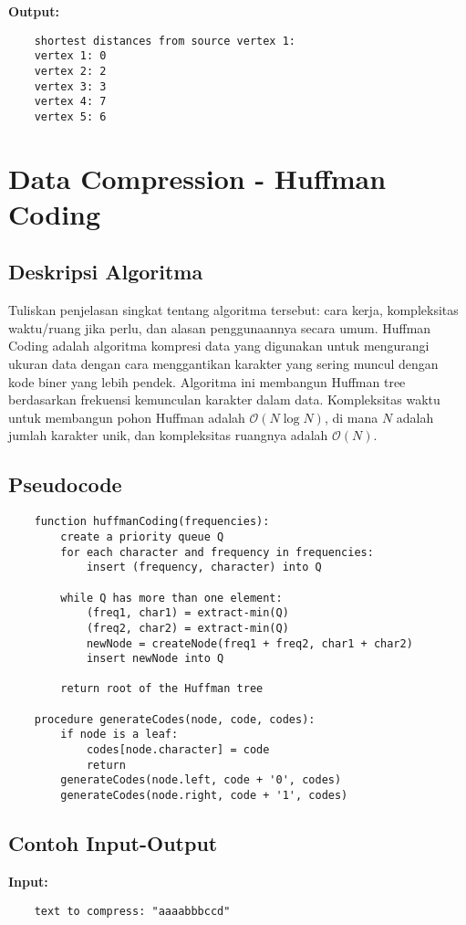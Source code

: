 \textbf{Output:}
\begin{verbatim}
    shortest distances from source vertex 1:
    vertex 1: 0
    vertex 2: 2
    vertex 3: 3
    vertex 4: 7
    vertex 5: 6
\end{verbatim}

\section{Data Compression - Huffman Coding}
\label{sec:huffman-coding-implementation}

\subsection{Deskripsi Algoritma}
Tuliskan penjelasan singkat tentang algoritma tersebut: cara kerja, kompleksitas waktu/ruang jika perlu, dan alasan penggunaannya secara umum.
Huffman Coding adalah algoritma kompresi data yang digunakan untuk mengurangi ukuran data dengan cara menggantikan karakter yang sering muncul dengan kode biner yang lebih pendek. Algoritma ini membangun Huffman tree berdasarkan frekuensi kemunculan karakter dalam data. Kompleksitas waktu untuk membangun pohon Huffman adalah $\mathcal{O}\left(N \log N\right)$, di mana $N$ adalah jumlah karakter unik, dan kompleksitas ruangnya adalah $\mathcal{O}\left(N\right)$.

\subsection{Pseudocode}
\begin{verbatim}
    function huffmanCoding(frequencies):
        create a priority queue Q
        for each character and frequency in frequencies:
            insert (frequency, character) into Q

        while Q has more than one element:
            (freq1, char1) = extract-min(Q)
            (freq2, char2) = extract-min(Q)
            newNode = createNode(freq1 + freq2, char1 + char2)
            insert newNode into Q

        return root of the Huffman tree

    procedure generateCodes(node, code, codes):
        if node is a leaf:
            codes[node.character] = code
            return
        generateCodes(node.left, code + '0', codes)
        generateCodes(node.right, code + '1', codes)
\end{verbatim}

\subsection{Contoh Input-Output}
\textbf{Input:}
\begin{verbatim}
    text to compress: "aaaabbbccd"
\end{verbatim}

